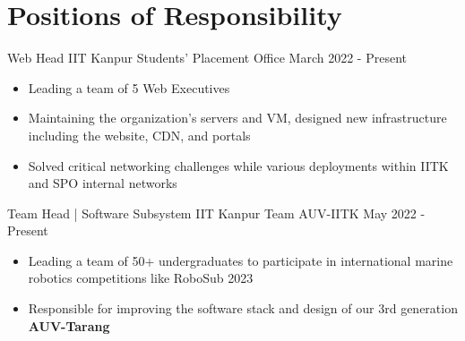 \section*{\sc Positions of Responsibility}
\vspace{-2mm}
\hrulefill
\vspace{1mm}

\cventry
{Web Head} %
{IIT Kanpur} %
{Students' Placement Office} %
{March 2022 - Present} %
{
  \begin{itemize} %
    \item Leading a team of 5 Web Executives 
    \item Maintaining the organization’s servers and VM, designed new infrastructure including the website, CDN, and portals
    \item Solved critical networking challenges while various deployments within IITK and SPO internal networks
  \end{itemize}
}

\cventry
{Team Head | Software Subsystem} %
{IIT Kanpur} %
{Team AUV-IITK} %
{May 2022 - Present} %
{
  \begin{itemize} %
    \item Leading a team of 50+ undergraduates to participate in international marine robotics competitions like RoboSub 2023 
    \item Responsible for improving the software stack and design of our 3rd generation \textbf{AUV-Tarang}
  \end{itemize}
}

